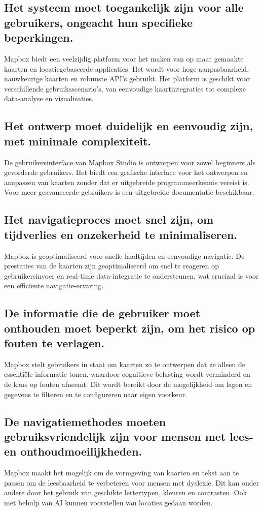 \subsection*{Het systeem moet toegankelijk zijn voor alle gebruikers, ongeacht hun specifieke beperkingen.}
Mapbox biedt een veelzijdig platform voor het maken van op maat gemaakte kaarten en locatiegebaseerde applicaties. Het wordt voor hoge aanpasbaarheid, nauwkeurige kaarten en robuuste API's gebruikt. Het platform is geschikt voor verschillende gebruiksscenario's, van eenvoudige kaartintegraties tot complexe data-analyse en visualisaties.
\subsection*{Het ontwerp moet duidelijk en eenvoudig zijn, met minimale complexiteit.}
De gebruikersinterface van Mapbox Studio is ontworpen voor zowel beginners als gevorderde gebruikers. Het biedt een grafische interface voor het ontwerpen en aanpassen van kaarten zonder dat er uitgebreide programmeerkennis vereist is. Voor meer geavanceerde gebruikers is een uitgebreide documentatie beschikbaar.
\subsection*{Het navigatieproces moet snel zijn, om tijdverlies en onzekerheid te minimaliseren.}
Mapbox is geoptimaliseerd voor snelle laadtijden en eenvoudige navigatie. De prestaties van de kaarten zijn geoptimaliseerd om snel te reageren op gebruikersinvoer en real-time data-integratie te ondersteunen, wat cruciaal is voor een efficiënte navigatie-ervaring.
\subsection*{De informatie die de gebruiker moet onthouden moet beperkt zijn, om het risico op fouten te verlagen.}
Mapbox stelt gebruikers in staat om kaarten zo te ontwerpen dat ze alleen de essentiële informatie tonen, waardoor cognitieve belasting wordt verminderd en de kans op fouten afneemt. Dit wordt bereikt door de mogelijkheid om lagen en gegevens te filteren en te configureren naar eigen voorkeur.
\subsection*{De navigatiemethodes moeten gebruiksvriendelijk zijn voor mensen met lees- en onthoudmoeilijkheden.}
Mapbox maakt het mogelijk om de vormgeving van kaarten en tekst aan te passen om de leesbaarheid te verbeteren voor mensen met dyslexie. Dit kan onder andere door het gebruik van geschikte lettertypen, kleuren en contrasten. Ook met behulp van AI kunnen voorstellen van locaties gedaan worden.
